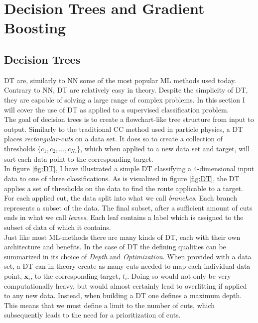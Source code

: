 \section{Decision Trees and Gradient Boosting}
\subsection{Decision Trees}
\acf{DT} are, similarly to \ac{NN} some of the most popular \ac{ML} methods used today.
Contrary to \ac{NN}, \ac{DT} are relatively easy in theory. Despite the simplicity of \ac{DT}, 
they are capable of solving a large range of complex problems. In this section I will cover the use 
of \ac{DT} as applied to a supervised classification problem.
\\
The goal of decision trees is to create a flowchart-like tree structure from input to output. 
Similarly to the traditional \ac{CC} method used in particle physics, a \ac{DT} 
places \emph{rectangular-cuts} on a data set. It does so to create a collection of thresholds 
$\{c_1, c_2,...,c_{N_c}\}$, which when applied to a new data set and target, 
will sort each data point to the corresponding target. 
\\
In figure \ref{fig:DT}, I have illustrated a simple \ac{DT} classifying a 4-dimensional 
input data to one of three classifications. As is visualized in figure \ref{fig:DT}, the \ac{DT} 
applies a set of thresholds on the data to find the route applicable to a target. For each applied 
cut, the data split into what we call \emph{branches}. Each branch represents a subset of the data.
The final subset, after a sufficient amount of cuts ends in what we call \emph{leaves}. Each leaf contains
a label which is assigned to the subset of data of which it contains.
\\  
Just like most \ac{ML}-methods there are many kinds of \ac{DT}, each with their own 
architecture and benefits. In the case of \ac{DT} the defining qualities can be summarized in
its choice of \emph{Depth} and \emph{Optimization}. When provided with a data set,
a \ac{DT} can in theory create as many cuts needed to map each individual data point, $\textbf{x}_i$, to the 
corresponding target, $t_i$. Doing so would not only be very computationally heavy, but would almost 
certainly lead to overfitting if applied to any new data. Instead, when building a \ac{DT} one defines 
a maximum depth. This means that we must define a limit to the number of cuts, which 
subsequently leads to the need for a prioritization of cuts. 
\\
